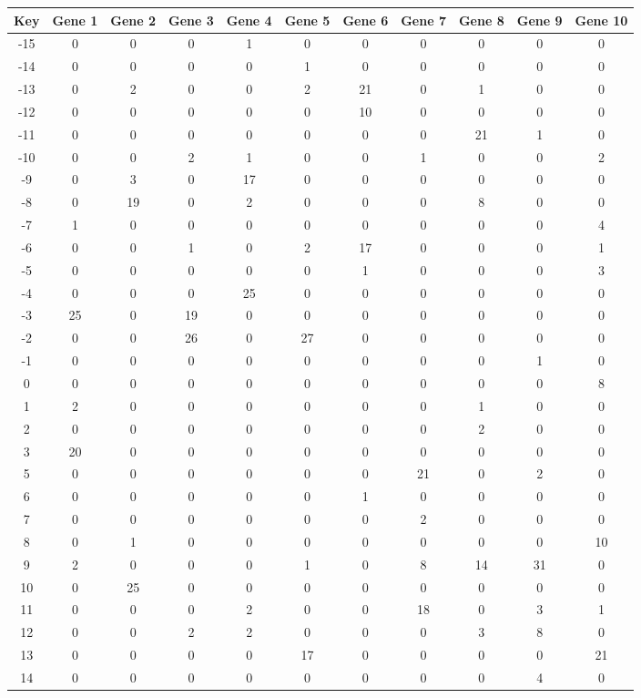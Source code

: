 \begin{tabular}{|c|c|c|c|c|c|c|c|c|c|c|}
\hline
Key & Gene 1 & Gene 2 & Gene 3 & Gene 4 & Gene 5 & Gene 6 & Gene 7 & Gene 8 & Gene 9 & Gene 10 \\
\hline
-15 & 0 & 0 & 0 & 1 & 0 & 0 & 0 & 0 & 0 & 0 \\
-14 & 0 & 0 & 0 & 0 & 1 & 0 & 0 & 0 & 0 & 0 \\
-13 & 0 & 2 & 0 & 0 & 2 & 21 & 0 & 1 & 0 & 0 \\
-12 & 0 & 0 & 0 & 0 & 0 & 10 & 0 & 0 & 0 & 0 \\
-11 & 0 & 0 & 0 & 0 & 0 & 0 & 0 & 21 & 1 & 0 \\
-10 & 0 & 0 & 2 & 1 & 0 & 0 & 1 & 0 & 0 & 2 \\
-9 & 0 & 3 & 0 & 17 & 0 & 0 & 0 & 0 & 0 & 0 \\
-8 & 0 & 19 & 0 & 2 & 0 & 0 & 0 & 8 & 0 & 0 \\
-7 & 1 & 0 & 0 & 0 & 0 & 0 & 0 & 0 & 0 & 4 \\
-6 & 0 & 0 & 1 & 0 & 2 & 17 & 0 & 0 & 0 & 1 \\
-5 & 0 & 0 & 0 & 0 & 0 & 1 & 0 & 0 & 0 & 3 \\
-4 & 0 & 0 & 0 & 25 & 0 & 0 & 0 & 0 & 0 & 0 \\
-3 & 25 & 0 & 19 & 0 & 0 & 0 & 0 & 0 & 0 & 0 \\
-2 & 0 & 0 & 26 & 0 & 27 & 0 & 0 & 0 & 0 & 0 \\
-1 & 0 & 0 & 0 & 0 & 0 & 0 & 0 & 0 & 1 & 0 \\
0 & 0 & 0 & 0 & 0 & 0 & 0 & 0 & 0 & 0 & 8 \\
1 & 2 & 0 & 0 & 0 & 0 & 0 & 0 & 1 & 0 & 0 \\
2 & 0 & 0 & 0 & 0 & 0 & 0 & 0 & 2 & 0 & 0 \\
3 & 20 & 0 & 0 & 0 & 0 & 0 & 0 & 0 & 0 & 0 \\
5 & 0 & 0 & 0 & 0 & 0 & 0 & 21 & 0 & 2 & 0 \\
6 & 0 & 0 & 0 & 0 & 0 & 1 & 0 & 0 & 0 & 0 \\
7 & 0 & 0 & 0 & 0 & 0 & 0 & 2 & 0 & 0 & 0 \\
8 & 0 & 1 & 0 & 0 & 0 & 0 & 0 & 0 & 0 & 10 \\
9 & 2 & 0 & 0 & 0 & 1 & 0 & 8 & 14 & 31 & 0 \\
10 & 0 & 25 & 0 & 0 & 0 & 0 & 0 & 0 & 0 & 0 \\
11 & 0 & 0 & 0 & 2 & 0 & 0 & 18 & 0 & 3 & 1 \\
12 & 0 & 0 & 2 & 2 & 0 & 0 & 0 & 3 & 8 & 0 \\
13 & 0 & 0 & 0 & 0 & 17 & 0 & 0 & 0 & 0 & 21 \\
14 & 0 & 0 & 0 & 0 & 0 & 0 & 0 & 0 & 4 & 0 \\
\hline
\end{tabular}